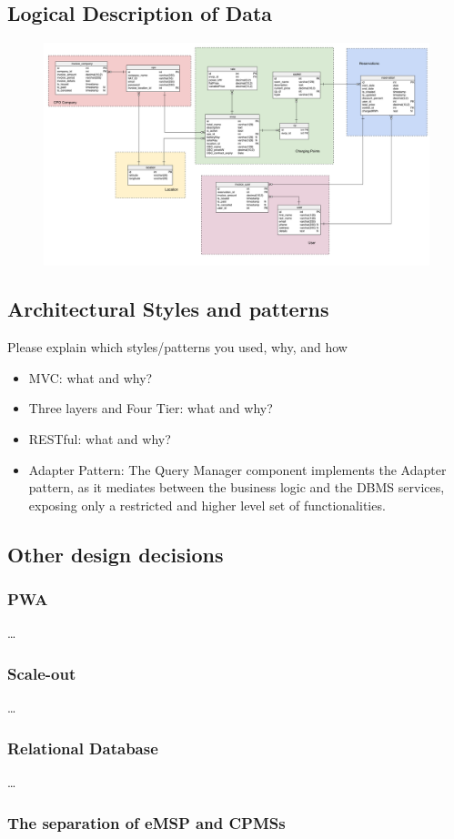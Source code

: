 \subsection{Logical Description of Data}
\begin{figure}[H]
    \includegraphics[scale=0.30]{src/ERDiagram/er_diagram.pdf}
\end{figure}

\subsection{Architectural Styles and patterns}
Please explain which styles/patterns you used, why, and how

\begin{itemize}
    \item MVC: what and why?
    \item Three layers and Four Tier: what and why?
    \item RESTful: what and why?
    \item Adapter Pattern: The Query Manager component implements the Adapter pattern, as it mediates between the
          business logic and the DBMS services, exposing only a restricted and higher level set of functionalities.
\end{itemize}
\subsection{Other design decisions}
\subsubsection{PWA}
\dots
\subsubsection{Scale-out}
\dots
\subsubsection{Relational Database}
\dots
\subsubsection{The separation of eMSP and CPMSs}